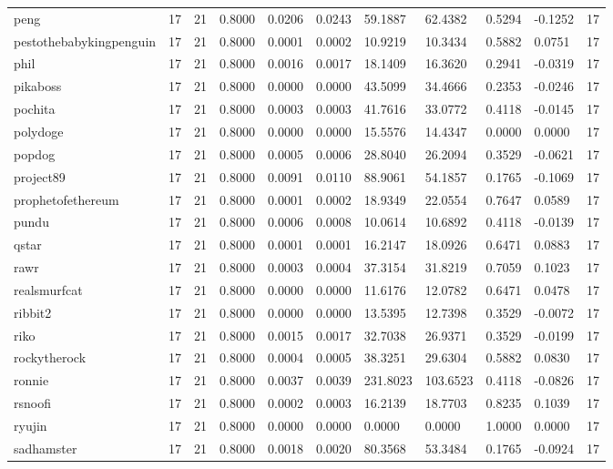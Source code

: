 \begin{table}[htbp]
\begin{tabular}{lllllllllll}
peng & 17 & 21 & 0.8000 & 0.0206 & 0.0243 & 59.1887 & 62.4382 & 0.5294 & -0.1252 & 17 \\
pestothebabykingpenguin & 17 & 21 & 0.8000 & 0.0001 & 0.0002 & 10.9219 & 10.3434 & 0.5882 & 0.0751 & 17 \\
phil & 17 & 21 & 0.8000 & 0.0016 & 0.0017 & 18.1409 & 16.3620 & 0.2941 & -0.0319 & 17 \\
pikaboss & 17 & 21 & 0.8000 & 0.0000 & 0.0000 & 43.5099 & 34.4666 & 0.2353 & -0.0246 & 17 \\
pochita & 17 & 21 & 0.8000 & 0.0003 & 0.0003 & 41.7616 & 33.0772 & 0.4118 & -0.0145 & 17 \\
polydoge & 17 & 21 & 0.8000 & 0.0000 & 0.0000 & 15.5576 & 14.4347 & 0.0000 & 0.0000 & 17 \\
popdog & 17 & 21 & 0.8000 & 0.0005 & 0.0006 & 28.8040 & 26.2094 & 0.3529 & -0.0621 & 17 \\
project89 & 17 & 21 & 0.8000 & 0.0091 & 0.0110 & 88.9061 & 54.1857 & 0.1765 & -0.1069 & 17 \\
prophetofethereum & 17 & 21 & 0.8000 & 0.0001 & 0.0002 & 18.9349 & 22.0554 & 0.7647 & 0.0589 & 17 \\
pundu & 17 & 21 & 0.8000 & 0.0006 & 0.0008 & 10.0614 & 10.6892 & 0.4118 & -0.0139 & 17 \\
qstar & 17 & 21 & 0.8000 & 0.0001 & 0.0001 & 16.2147 & 18.0926 & 0.6471 & 0.0883 & 17 \\
rawr & 17 & 21 & 0.8000 & 0.0003 & 0.0004 & 37.3154 & 31.8219 & 0.7059 & 0.1023 & 17 \\
realsmurfcat & 17 & 21 & 0.8000 & 0.0000 & 0.0000 & 11.6176 & 12.0782 & 0.6471 & 0.0478 & 17 \\
ribbit2 & 17 & 21 & 0.8000 & 0.0000 & 0.0000 & 13.5395 & 12.7398 & 0.3529 & -0.0072 & 17 \\
riko & 17 & 21 & 0.8000 & 0.0015 & 0.0017 & 32.7038 & 26.9371 & 0.3529 & -0.0199 & 17 \\
rockytherock & 17 & 21 & 0.8000 & 0.0004 & 0.0005 & 38.3251 & 29.6304 & 0.5882 & 0.0830 & 17 \\
ronnie & 17 & 21 & 0.8000 & 0.0037 & 0.0039 & 231.8023 & 103.6523 & 0.4118 & -0.0826 & 17 \\
rsnoofi & 17 & 21 & 0.8000 & 0.0002 & 0.0003 & 16.2139 & 18.7703 & 0.8235 & 0.1039 & 17 \\
ryujin & 17 & 21 & 0.8000 & 0.0000 & 0.0000 & 0.0000 & 0.0000 & 1.0000 & 0.0000 & 17 \\
sadhamster & 17 & 21 & 0.8000 & 0.0018 & 0.0020 & 80.3568 & 53.3484 & 0.1765 & -0.0924 & 17 \\

\end{tabular}
\end{table}
